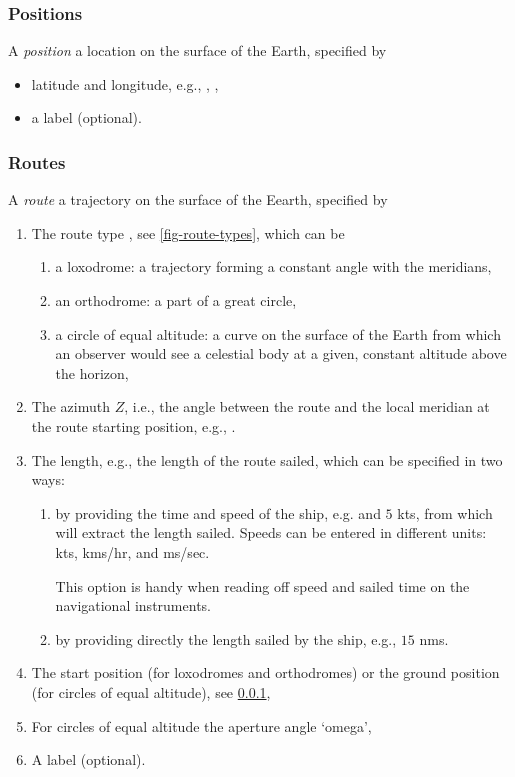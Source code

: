 \documentclass{ol-softwaremanual}
\begin{document}
\subsubsection{Positions}  \label{section-positions} 

A \textit{position} a  location on the surface of the Earth, specified by 
\begin{itemize}
\item latitude and longitude, e.g., , ,
\item a label (optional).
\end{itemize}
\subsubsection{Routes} \label{section-routes} 

A \textit{route} a trajectory on the surface of the Eearth, specified by 
\begin{enumerate}
  \item \label{item-route-type} The route type \cite{bowditch2002the}, see \cref{fig-route-types}, which can be 
  \begin{enumerate}
  \item a loxodrome: a trajectory forming a constant angle with the meridians,
  \item an orthodrome: a part of a great circle,
  \item  a circle of equal altitude: a curve on the surface of the Earth from which an observer would see a celestial body at a given, constant altitude above the horizon,
  \end{enumerate}
  \item \label{item-route-azimuth} The azimuth $Z$, i.e., the angle between the route  and the local meridian at the route starting position, e.g., .
  \item \label{item-route-length} The length, e.g., the length of the route sailed, which can be specified in two ways:
  \begin{enumerate}
  \item by providing the time and speed of the ship, e.g.   and $5$ \acp{kt}, from which  \thel will extract the length sailed. Speeds can be entered in different units: \acp{kt}, \acp{km}/\ac{hr},  and \acp{m}/\ac{sec}. 
  
  This option is handy when reading off speed and sailed time  on the navigational instruments. 
  \item by providing directly the length sailed by the ship, e.g.,  $15$ \acp{nm}. 
  \end{enumerate}

  \item \label{item-route-reference-position} The start position (for loxodromes and orthodromes) or the ground position (for circles of equal altitude), see \cref{section-positions},
  \item \label{item-route-aperture} For circles of equal altitude the aperture angle `omega',
  \item \label{item-route-label} A label (optional). 
\end{enumerate}
\end{document}
